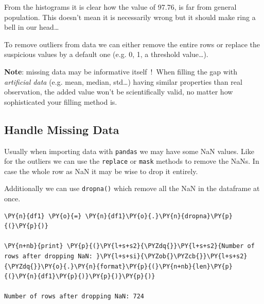 From the histograms it is clear how the value of 97.76, is far from general population. 
This doesn't mean it is necessarily wrong but it should make ring a bell in our head\ldots

To remove outliers from data we can either remove the entire rows or replace the suspicious values by a default one 
(e.g. 0, 1, a threshold value\ldots).

\textbf{Note}: missing data may be informative itself~!~When filling the gap with \emph{artificial data} 
(e.g. mean, median, std\ldots) having similar properties than real observation, the added value won't be 
scientifically valid, no matter how sophisticated your filling method is.

\begin{Shaded}
\begin{Highlighting}[]

\NormalTok{, }\NormalTok{)      }
\OperatorTok{=}

\OperatorTok{=}\OperatorTok{>=} \NormalTok{, }\NormalTok{)   }
\end{Highlighting}
\end{Shaded}

\subsection{Handle Missing Data}\label{handle-missing-data}

Usually when importing data with \texttt{pandas} we may have some NaN values.
Like for the outliers we can use the \texttt{replace} or \texttt{mask} methods to remove the NaNs. 
In case the whole row as NaN it may be wise to drop it entirely.

Additionally we can use \texttt{dropna()} which remove all the NaN in the dataframe at once.

\begin{tcolorbox}[breakable, size=fbox, boxrule=1pt, pad at break*=1mm,colback=cellbackground, colframe=cellborder]
\begin{Verbatim}[commandchars=\\\{\}]
\PY{n}{df1} \PY{o}{=} \PY{n}{df1}\PY{o}{.}\PY{n}{dropna}\PY{p}{(}\PY{p}{)}

\PY{n+nb}{print} \PY{p}{(}\PY{l+s+s2}{\PYZdq{}}\PY{l+s+s2}{Number of rows after dropping NaN: }\PY{l+s+si}{\PYZob{}\PYZcb{}}\PY{l+s+s2}{\PYZdq{}}\PY{o}{.}\PY{n}{format}\PY{p}{(}\PY{n+nb}{len}\PY{p}{(}\PY{n}{df1}\PY{p}{)}\PY{p}{)}\PY{p}{)}

Number of rows after dropping NaN: 724
\end{Verbatim}
\end{tcolorbox}

